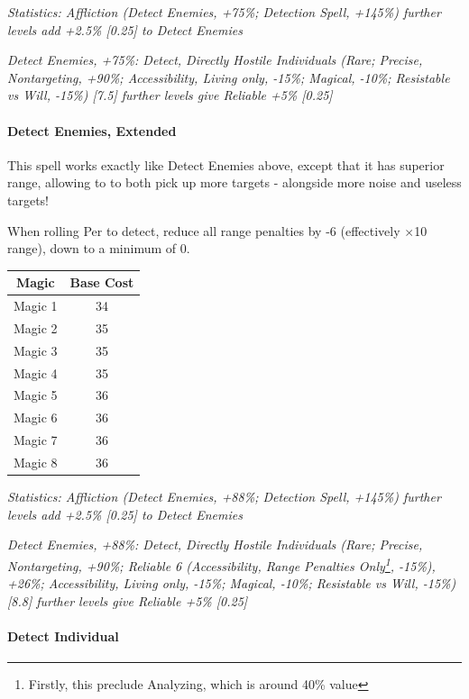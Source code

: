 \begin{multicols*}{3}
	\textcolor{OliveGreen}{\textit{ Statistics: Affliction (Detect Enemies, +75\%; Detection Spell, +145\%) further levels add +2.5\% [0.25] to Detect Enemies}}
	
	\textcolor{OliveGreen}{\textit{Detect Enemies, +75\%: Detect, Directly Hostile Individuals (Rare; Precise, Nontargeting, +90\%; Accessibility, Living only, -15\%; Magical, -10\%; Resistable vs Will, -15\%) [7.5] further levels give Reliable +5\% [0.25]}}
	
	\paragraph{Detect Enemies, Extended}
	
	This spell works exactly like Detect Enemies above, except that it has superior range, allowing to to both pick up more targets - alongside more noise and useless targets!
	
	When rolling Per to detect, reduce all range penalties by -6 (effectively $\times$10 range), down to a minimum of 0.
	
	\begin{center}
		\begin{tabular}{|c|c|}
			\hline
			Magic & Base Cost \\
			\hline
			\hline
			Magic 1 & 34 \\
			Magic 2 & 35 \\
			Magic 3 & 35 \\
			Magic 4 & 35 \\
			Magic 5 & 36 \\
			Magic 6 & 36 \\
			Magic 7 & 36 \\
			Magic 8 & 36 \\
			\hline
		\end{tabular}
	\end{center} 
	
	\textcolor{OliveGreen}{\textit{ Statistics: Affliction (Detect Enemies, +88\%; Detection Spell, +145\%) further levels add +2.5\% [0.25] to Detect Enemies}}
	
	\textcolor{OliveGreen}{\textit{Detect Enemies, +88\%: Detect, Directly Hostile Individuals (Rare; Precise, Nontargeting, +90\%; Reliable 6 (Accessibility, Range Penalties Only\footnote{Firstly, this preclude Analyzing, which is around 40\% value}, -15\%), +26\%; Accessibility, Living only, -15\%; Magical, -10\%; Resistable vs Will, -15\%) [8.8] further levels give Reliable +5\% [0.25]}}
	
	\paragraph{Detect Individual}
		

\end{multicols*}
